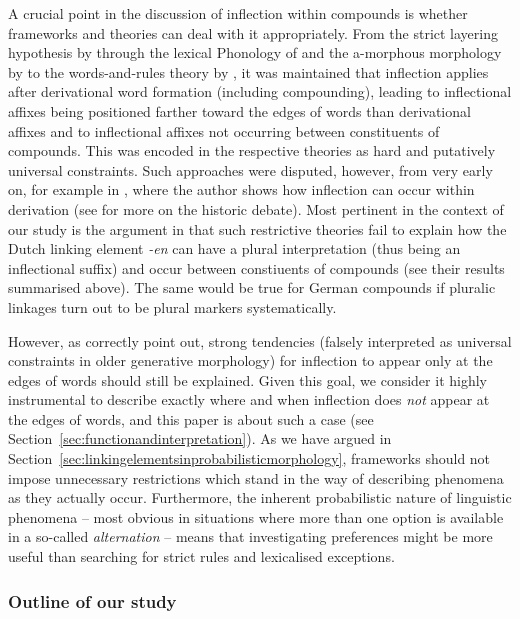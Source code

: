 A crucial point in the discussion of inflection within compounds is whether frameworks and theories can deal with it appropriately.
From the strict layering hypothesis by \textcite{Siegel1979} through the lexical Phonology of \textcite{Mohanan1986} and the a-morphous morphology by \textcite{Anderson1992} to the words-and-rules theory by \textcite{Pinker1999}, it was maintained that inflection applies after derivational word formation (including compounding), leading to inflectional affixes being positioned farther toward the edges of words than derivational affixes and to inflectional affixes not occurring between constituents of compounds.
This was encoded in the respective theories as hard and putatively universal constraints.
Such approaches were disputed, however, from very early on, for example in \textcite{Bochner1984}, where the author shows how inflection can occur within derivation (see \citealt[2--3]{KirchnerNicoladis2009} for more on the historic debate).
Most pertinent in the context of our study is the argument in \textcite[47--48]{BangaEa2013a} that such restrictive theories fail to explain how the Dutch linking element \textit{-en} can have a plural interpretation (thus being an inflectional suffix) and occur between constiuents of compounds (see their results summarised above).
The same would be true for German compounds if pluralic linkages turn out to be plural markers systematically.

However, as \textcite[5]{KirchnerNicoladis2009} correctly point out, strong tendencies (falsely interpreted as universal constraints in older generative morphology) for inflection to appear only at the edges of words should still be explained.
Given this goal, we consider it highly instrumental to describe exactly where and when inflection does \textit{not} appear at the edges of words, and this paper is about such a case (see Section~\ref{sec:functionandinterpretation}).
As we have argued in Section~\ref{sec:linkingelementsinprobabilisticmorphology}, frameworks should not impose unnecessary restrictions which stand in the way of describing phenomena as they actually occur.
Furthermore, the inherent probabilistic nature of linguistic phenomena -- most obvious in situations where more than one option is available in a so-called \textit{alternation} -- means that investigating preferences might be more useful than searching for strict rules and lexicalised exceptions.

\subsubsection{Outline of our study}

